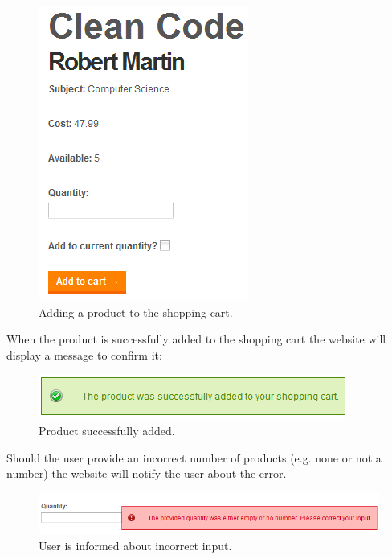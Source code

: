 \begin{figure}[H]
\begin{center}
\includegraphics[scale=1]{gfx/add_product.png}
\caption{Adding a product to the shopping cart.}
\label{fig:add_product}
\end{center}
\end{figure}

When the product is successfully added to the shopping cart the website will display a message to confirm it:

\begin{figure}[H]
\begin{center}
\includegraphics[scale=1]{gfx/adding_successful.png}
\caption{Product successfully added.}
\label{fig:successful_add}
\end{center}
\end{figure}

Should the user provide an incorrect number of products (e.g. none or not a number) the website will notify the user about the error.

\begin{figure}[H]
\begin{center}
\includegraphics[width=\textwidth]{gfx/incorrect_quantity.png}
\caption{User is informed about incorrect input.}
\label{fig:incorrect_add}
\end{center}
\end{figure}


